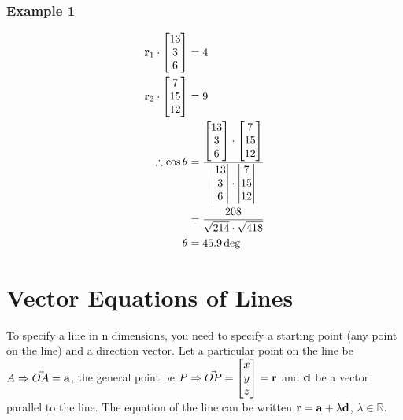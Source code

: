 \documentclass[a4paper,12pt]{article}
\begin{document}
\subsubsection*{Example 1}
\begin{align*}
\bold{r}_1 \cdot \begin{bmatrix} 13 \\ 3 \\ 6 \end{bmatrix} & = 4 \\
\bold{r}_2 \cdot \begin{bmatrix} 7 \\ 15 \\ 12 \end{bmatrix} & = 9 \\
\therefore \cos \theta & = \frac{\begin{bmatrix} 13 \\ 3 \\ 6 \end{bmatrix} \cdot \begin{bmatrix} 7 \\ 15 \\ 12 \end{bmatrix}}{\begin{vmatrix} 13 \\ 3 \\ 6 \end{vmatrix} \cdot \begin{vmatrix} 7 \\ 15 \\ 12 \end{vmatrix}} \\
& = \frac{208}{\sqrt{214}\cdot\sqrt{418}} \\
\theta & = 45.9 \deg \\
\end{align*}

\section*{Vector Equations of Lines}
To specify a line in n dimensions, you need to specify a starting point (any point on the line) and a direction vector. Let a particular point on the line be $A \Rightarrow \vec{OA} = \bold{a}$, the general point be $P \Rightarrow \vec{OP} = \begin{bmatrix} x \\ y \\ z \\\end{bmatrix} = \bold{r}$ and $\bold{d}$ be a vector parallel to the line. The equation of the line can be written $\bold{r} = \bold{a} + \lambda \bold{d}$, $\lambda \in \mathbb{R}$. \\
\end{document}
